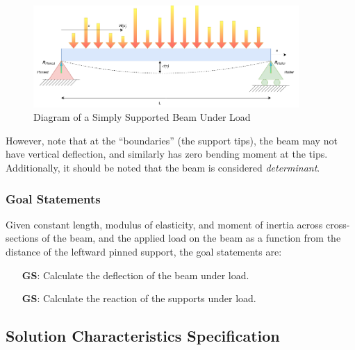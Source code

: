\documentclass[12pt]{article}
\newcounter{goalnum} %
\begin{document}
\begin{figure}[H]
    \begin{center}
        \includegraphics[width=0.9\textwidth]{temp/beam_bending_diagram_annotated.drawio.png}
        \caption{\label{beam_bending_diagram_annotated} Diagram of a Simply Supported Beam Under Load}
    \end{center}
\end{figure}

However, note that at the ``boundaries'' (the support tips), the beam may not
have vertical deflection, and similarly has zero bending moment at the tips.
Additionally, it should be noted that the beam is considered
\textit{determinant}.

\subsubsection{Goal Statements}
\label{sssec_goals}

\noindent{}Given constant length, modulus of elasticity, and moment of inertia
across cross-sections of the beam, and the applied load on the beam as a
function from the distance of the leftward pinned support, the goal statements
are:

\begin{itemize}

    \item[\refstepcounter{goalnum}\textbf{GS\thegoalnum{}}\label{deflection}:]
        Calculate the deflection of the beam under load.

    \item[\refstepcounter{goalnum}\textbf{GS\thegoalnum{}}\label{reaction}:]
        Calculate the reaction of the supports under load.

\end{itemize}

\subsection{Solution Characteristics Specification}
\end{document}
